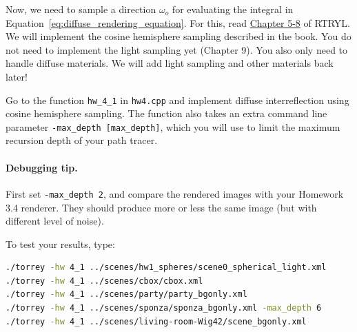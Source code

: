 Now, we need to sample a direction $\omega_o$ for evaluating the integral in Equation~\eqref{eq:diffuse_rendering_equation}. For this, read \href{https://raytracing.github.io/books/RayTracingTheRestOfYourLife.html#lightscattering}{Chapter 5-8} of RTRYL. We will implement the cosine hemisphere sampling described in the book. You do not need to implement the light sampling yet (Chapter 9). You also only need to handle diffuse materials. We will add light sampling and other materials back later!

Go to the function \lstinline{hw_4_1} in \lstinline{hw4.cpp} and implement diffuse interreflection using cosine hemisphere sampling. The function also takes an extra command line parameter \lstinline{-max_depth [max_depth]}, which you will use to limit the maximum recursion depth of your path tracer. 

\paragraph{Debugging tip.} First set \lstinline{-max_depth 2}, and compare the rendered images with your Homework 3.4 renderer. They should produce more or less the same image (but with different level of noise).  

To test your results, type:
\begin{lstlisting}[language=bash]
./torrey -hw 4_1 ../scenes/hw1_spheres/scene0_spherical_light.xml
./torrey -hw 4_1 ../scenes/cbox/cbox.xml
./torrey -hw 4_1 ../scenes/party/party_bgonly.xml
./torrey -hw 4_1 ../scenes/sponza/sponza_bgonly.xml -max_depth 6
./torrey -hw 4_1 ../scenes/living-room-Wig42/scene_bgonly.xml
\end{lstlisting}

